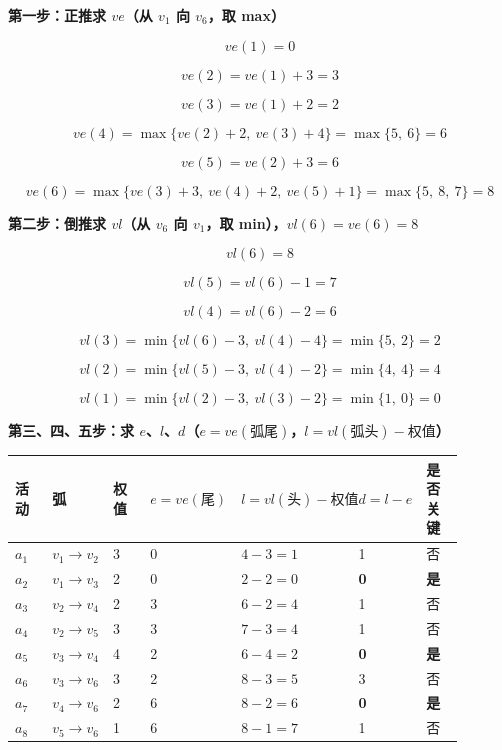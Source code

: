 \documentclass[11pt,openany,UTF8]{ctexbook}
\begin{document}
\textbf{第一步：正推求 $ve$（从 $v_1$ 向 $v_6$，取 max）}

\[ve(1)=0\]

\[ve(2)=ve(1)+3=3\]

\[ve(3)=ve(1)+2=2\]

\[ve(4)=\max\{ve(2)+2,\ ve(3)+4\}=\max\{5,\ 6\}=6\]

\[ve(5)=ve(2)+3=6\]

\[ve(6)=\max\{ve(3)+3,\ ve(4)+2,\ ve(5)+1\}=\max\{5,\ 8,\ 7\}=8\]

\textbf{第二步：倒推求 $vl$（从 $v_6$ 向 $v_1$，取 min），$vl(6)=ve(6)=8$}

\[vl(6)=8\]

\[vl(5)=vl(6)-1=7\]

\[vl(4)=vl(6)-2=6\]

\[vl(3)=\min\{vl(6)-3,\ vl(4)-4\}=\min\{5,\ 2\}=2\]

\[vl(2)=\min\{vl(5)-3,\ vl(4)-2\}=\min\{4,\ 4\}=4\]

\[vl(1)=\min\{vl(2)-3,\ vl(3)-2\}=\min\{1,\ 0\}=0\]

\textbf{第三、四、五步：求 $e$、$l$、$d$（$e=ve(\text{弧尾})$，$l=vl(\text{弧头})-\text{权值}$）}

\begingroup\small\setlength{\tabcolsep}{3.0pt}
\begin{longtable}{@{}L{0.1271\linewidth}L{0.1271\linewidth}L{0.1271\linewidth}L{0.1271\linewidth}L{0.1271\linewidth}L{0.1271\linewidth}L{0.1271\linewidth}@{}}
\toprule
\textbf{活动} & \textbf{弧} & \textbf{权值} & \textbf{$e=ve(\text{尾})$} & \textbf{$l=vl(\text{头})-\text{权值}$} & \textbf{$d=l-e$} & \textbf{是否关键} \\
\midrule
\endhead
$a_1$ & $v_1\to v_2$ & 3 & 0 & $4-3=1$ & 1 & 否 \\
$a_2$ & $v_1\to v_3$ & 2 & 0 & $2-2=0$ & \textbf{0} & \textbf{是} \\
$a_3$ & $v_2\to v_4$ & 2 & 3 & $6-2=4$ & 1 & 否 \\
$a_4$ & $v_2\to v_5$ & 3 & 3 & $7-3=4$ & 1 & 否 \\
$a_5$ & $v_3\to v_4$ & 4 & 2 & $6-4=2$ & \textbf{0} & \textbf{是} \\
$a_6$ & $v_3\to v_6$ & 3 & 2 & $8-3=5$ & 3 & 否 \\
$a_7$ & $v_4\to v_6$ & 2 & 6 & $8-2=6$ & \textbf{0} & \textbf{是} \\
$a_8$ & $v_5\to v_6$ & 1 & 6 & $8-1=7$ & 1 & 否 \\
\bottomrule
\end{longtable}
\endgroup
\end{document}
